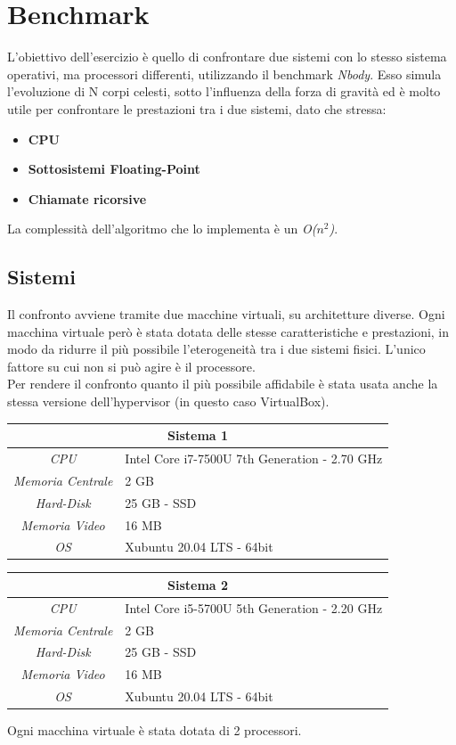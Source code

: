 \chapter{Benchmark}
L'obiettivo dell'esercizio è quello di confrontare due sistemi con lo stesso sistema operativi, ma processori differenti, utilizzando il benchmark \textit{Nbody}. Esso simula l'evoluzione di N corpi celesti, sotto l'influenza della forza di gravità ed è molto utile per confrontare le prestazioni tra i due sistemi, dato che stressa:
\begin{itemize}
	\item \textbf{CPU}
	\item \textbf{Sottosistemi Floating-Point}
	\item \textbf{Chiamate ricorsive}
\end{itemize}
La complessità dell'algoritmo che lo implementa è un \textit{O($n^2$)}.

\section{Sistemi}
Il confronto avviene tramite due macchine virtuali, su architetture diverse. Ogni macchina virtuale però è stata dotata delle stesse caratteristiche e prestazioni, in modo da ridurre il più possibile l'eterogeneità tra i due sistemi fisici. L'unico fattore su cui non si può agire è il processore. 
\\Per rendere il confronto quanto il più possibile affidabile è stata usata anche la stessa versione dell'hypervisor (in questo caso VirtualBox).
\begin{table}[H]
	\begin{center}
		\begin{tabularx}{0.49\textwidth}{|c|X|}
			\hline
			\multicolumn{2}{|c|}{\textbf{Sistema 1}} \\
			\hline
			\textit{CPU} & Intel Core i7-7500U 7th Generation - 2.70 GHz \\
			\hline
			\textit{Memoria Centrale} & 2 GB \\
			\hline
			\textit{Hard-Disk} & 25 GB - SSD \\
			\hline
			\textit{Memoria Video} & 16 MB \\
			\hline
			\textit{OS} & Xubuntu 20.04 LTS - 64bit \\
			\hline
		\end{tabularx}
		\begin{tabularx}{0.49\textwidth}{|c|X|}
			\hline
			\multicolumn{2}{|c|}{\textbf{Sistema 2}} \\
			\hline
			\textit{CPU} & Intel Core i5-5700U 5th Generation - 2.20 GHz\\
			\hline
			\textit{Memoria Centrale} & 2 GB \\
			\hline
			\textit{Hard-Disk} & 25 GB - SSD \\
			\hline
			\textit{Memoria Video} & 16 MB \\
			\hline
			\textit{OS} & Xubuntu 20.04 LTS - 64bit \\
			\hline
		\end{tabularx}
	\end{center}
\end{table}
Ogni macchina virtuale è stata dotata di 2 processori.
